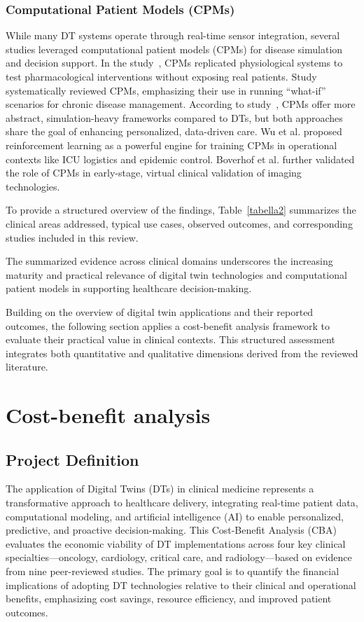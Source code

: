 \documentclass[10pt,a4paper]{article}
\begin{document}
\subsubsection*{Computational Patient Models (CPMs)}
While many DT systems operate through real-time sensor integration, several studies leveraged computational patient models (CPMs) for disease simulation and decision support.  
In the study~\cite{Balasubramanyam2024}, CPMs replicated physiological systems to test pharmacological interventions without exposing real patients.  
Study~\cite{Khater2024b} systematically reviewed CPMs, emphasizing their use in running “what-if” scenarios for chronic disease management.  
According to study~\cite{Fekonja2024}, CPMs offer more abstract, simulation-heavy frameworks compared to DTs, but both approaches share the goal of enhancing personalized, data-driven care.  
Wu et al.\cite{Wu2025} proposed reinforcement learning as a powerful engine for training CPMs in operational contexts like ICU logistics and epidemic control. Boverhof et al.\cite{Boverhof2024} further validated the role of CPMs in early-stage, virtual clinical validation of imaging technologies.

To provide a structured overview of the findings, Table~\ref{tabella2} summarizes the clinical areas addressed, typical use cases, observed outcomes, and corresponding studies included in this review.

The summarized evidence across clinical domains underscores the increasing maturity and practical relevance of digital twin technologies and computational patient models in supporting healthcare decision-making. 

Building on the overview of digital twin applications and their reported outcomes, the following section applies a cost-benefit analysis framework to evaluate their practical value in clinical contexts. This structured assessment integrates both quantitative and qualitative dimensions derived from the reviewed literature.

\newpage
\section{Cost-benefit analysis}
 \subsection*{Project Definition}

The application of Digital Twins (DTs) in clinical medicine represents a transformative approach to healthcare delivery, integrating real-time patient data, computational modeling, and artificial intelligence (AI) to enable personalized, predictive, and proactive decision-making. This Cost-Benefit Analysis (CBA) evaluates the economic viability of DT implementations across four key clinical specialties—oncology, cardiology, critical care, and radiology—based on evidence from nine peer-reviewed studies. The primary goal is to quantify the financial implications of adopting DT technologies relative to their clinical and operational benefits, emphasizing cost savings, resource efficiency, and improved patient outcomes.
\end{document}

